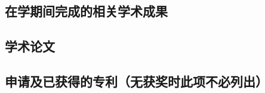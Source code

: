 \begin{resume}


  \section*{在学期间完成的相关学术成果}


  \subsection*{学术论文}


  \subsection*{申请及已获得的专利（无获奖时此项不必列出）}


\end{resume}
